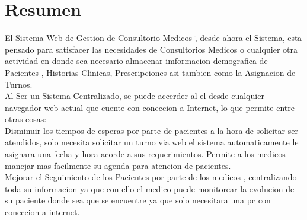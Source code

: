 \section{Resumen}

El \" Sistema Web de Gestion de Consultorio Medicos \" , desde ahora el Sistema,
esta pensado para satisfacer las necesidades de Consultorios Medicos o cualquier
otra actividad en donde sea necesario almacenar imformacion demografica de Pacientes
, Historias Clinicas, Prescripciones asi tambien como la Asignacion de Turnos.\\[0.1cm]

Al Ser un Sistema Centralizado, se puede accerder al el desde cualquier navegador
web actual que cuente con coneccion a Internet, lo que permite entre otras cosas:\\[0.1cm]

Disminuir los tiempos de esperas por parte de pacientes a la hora de solicitar ser
atendidos, solo necesita solicitar un turno via web el sistema automaticamente
le asignara una fecha y hora acorde a sus requerimientos. Permite a los medicos
manejar mas facilmente su agenda para atencion de pacientes.\\[0.1cm]

Mejorar el Seguimiento de los Pacientes por parte de los medicos , centralizando
toda su informacion ya que con ello el medico puede monitorear la evolucion de
su paciente donde sea que se encuentre ya que solo necesitara una pc con coneccion
a internet.\\[0.1cm]







